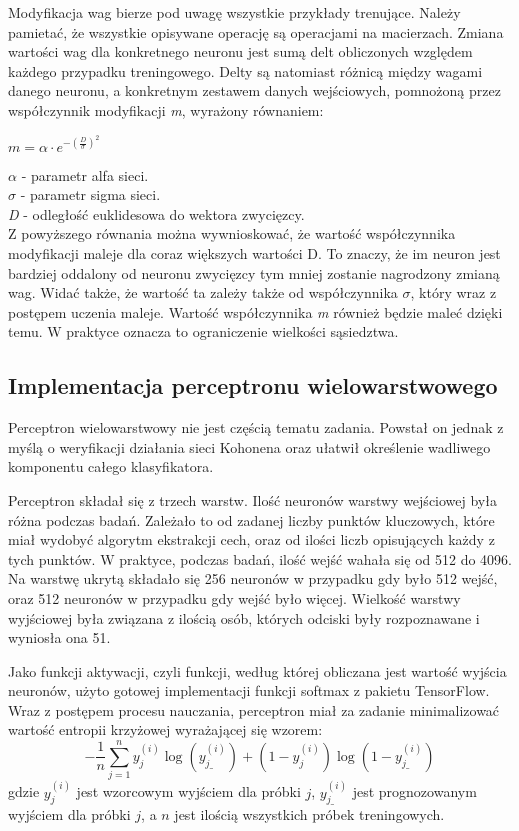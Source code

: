 \documentclass[12pt, notitlepage]{article}
\begin{document}
Modyfikacja wag bierze pod uwagę wszystkie przykłady trenujące. Należy pamietać, że wszystkie opisywane operację są operacjami na macierzach. Zmiana wartości wag dla konkretnego neuronu jest sumą delt obliczonych względem każdego przypadku treningowego. Delty są natomiast różnicą między wagami danego neuronu, a konkretnym zestawem danych wejściowych, pomnożoną przez współczynnik modyfikacji \textit{m}, wyrażony równaniem:
\begin{center}
    $ m = \alpha \cdot e^{-(\frac{D}{\sigma})^2} $ \\
\end{center}
$\alpha$ - parametr alfa sieci. \\
$\sigma$ - parametr sigma sieci. \\
\textit{D} - odległość euklidesowa do wektora zwycięzcy. \\
Z powyższego równania można wywnioskować, że wartość współczynnika modyfikacji maleje dla coraz większych wartości D. To znaczy, że im neuron jest bardziej oddalony od neuronu zwycięzcy tym mniej zostanie nagrodzony zmianą wag. Widać także, że wartość ta zależy także od współczynnika $\sigma$, który wraz z postępem uczenia maleje. Wartość współczynnika \textit{m} również będzie maleć dzięki temu. W praktyce oznacza to ograniczenie wielkości sąsiedztwa.

\subsection{Implementacja perceptronu wielowarstwowego}\label{sec:perceptron}

Perceptron wielowarstwowy nie jest częścią tematu zadania. Powstał on jednak z myślą o weryfikacji działania sieci Kohonena oraz ułatwił określenie wadliwego komponentu całego klasyfikatora.

Perceptron składał się z trzech warstw. Ilość neuronów warstwy wejściowej była różna podczas badań. Zależało to od zadanej liczby punktów kluczowych, które miał wydobyć algorytm ekstrakcji cech, oraz od ilości liczb opisujących każdy z tych punktów. W praktyce, podczas badań, ilość wejść wahała się od 512 do 4096. Na warstwę ukrytą składało się 256 neuronów w przypadku gdy było 512 wejść, oraz 512 neuronów w przypadku gdy wejść było więcej. Wielkość warstwy wyjściowej była związana z ilością osób, których odciski były rozpoznawane i wyniosła ona 51.

Jako funkcji aktywacji, czyli funkcji, według której obliczana jest wartość wyjścia neuronów, użyto gotowej implementacji funkcji softmax\cite{softmax} z pakietu TensorFlow. Wraz z postępem procesu nauczania, perceptron miał za zadanie minimalizować wartość entropii krzyżowej wyrażającej się wzorem: $$-\frac{1}{n}\sum_{j=1}^{n}y_j^{(i)}\log(y_{j\_}^{(i)}) + (1  - y_j^{(i)})\log(1 - y_{j\_}^{(i)})$$
gdzie $y_j^{(i)}$ jest wzorcowym wyjściem dla próbki $j$, $y_{j\_}^{(i)}$ jest prognozowanym wyjściem dla próbki $j$, a $n$ jest ilością wszystkich próbek treningowych.
\end{document}
